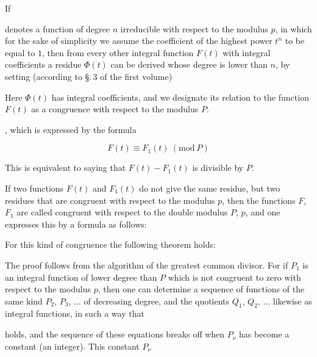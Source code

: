 If


denotes a function of degree $n$ irreducible with respect to the modulus $p$, in which for the sake of simplicity we assume the coefficient of the highest power $t^n$ to be equal to $1$, then from every other integral function $F(t)$ with integral coefficients a residue $\Phi(t)$ can be derived whose degree is lower than $n$, by setting (according to \S.\,3 of the first volume)


Here $\Phi(t)$ has integral coefficients, and we designate its relation to the function $F(t)$ as a congruence with respect to the modulus $P$.

, which is expressed by the formula

\[
F(t) \equiv F_1(t)\ (\mathrm{mod}\ P)
\]

This is equivalent to saying that $F(t) - F_1(t)$ is divisible by $P$.

If two functions $F(t)$ and $F_1(t)$ do not give the same residue, but two residues that are congruent with respect to the modulus $p$, then the functions $F$, $F_1$ are called congruent with respect to the double modulus $P$, $p$, and one expresses this by a formula as follows:


For this kind of congruence the following theorem holds:


The proof follows from the algorithm of the greatest common divisor. For if $P_1$ is an integral function of lower degree than $P$ which is not congruent to zero with respect to the modulus $p$, then one can determine a sequence of functions of the same kind $P_2$, $P_3$, $\ldots$ of decreasing degree, and the quotients $Q_1$, $Q_2$, $\ldots$ likewise as integral functions, in such a way that


holds, and the sequence of these equations breaks off when $P_\nu$ has become a constant (an integer). This constant $P_\nu$
